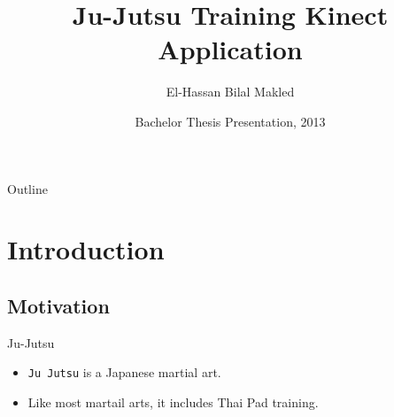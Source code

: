 \documentclass{beamer}
\title[Ju-Jutsu Training Kinect Application] %
{Ju-Jutsu Training Kinect Application}
\author[El-Hassan Bilal Makled] %
{El-Hassan Bilal Makled}
\institute[German University in Cairo] %
{
  Faculty of Media Engineering and Technology\\
  German University in Cairo
  }
\date[2013] %
{Bachelor Thesis Presentation, 2013}
\begin{document}
\begin{frame}
  \titlepage
\end{frame}

\begin{frame}{Outline}
  \tableofcontents
\end{frame}





\section{Introduction}

\subsection{Motivation}

\begin{frame}{Ju-Jutsu}

  \begin{itemize}
  \item
    \texttt{Ju Jutsu} is a Japanese martial art.
  \item
    Like most martail arts, it includes Thai Pad training.
  \end{itemize}
\end{frame}
\end{document}
